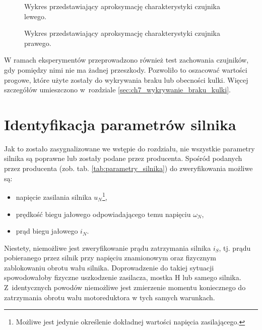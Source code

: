 \begin{figure}[h]
    \centering
    
    \caption{Wykres przedstawiający aproksymację charakterystyki czujnika lewego.}
    \label{fig:aproksymacja_czujnika_lewego}
\end{figure}

\begin{figure}[h]
    \centering
    
    \caption{Wykres przedstawiający aproksymację charakterystyki czujnika prawego.}
    \label{fig:aproksymacja_czujnika_prawego}
\end{figure}

W ramach eksperymentów przeprowadzono również test zachowania czujników, gdy pomiędzy nimi nie ma żadnej przeszkody. Pozwoliło to oszacować wartości progowe, które użyte zostały do wykrywania braku lub obecności kulki. Więcej szczegółów umieszczono w~rozdziale \ref{sec:ch7_wykrywanie_braku_kulki}.

\section{Identyfikacja parametrów silnika}
\label{sec:ch5_identyfikacja_parametrow_silnika}

Jak to zostało zasygnalizowane we wstępie do rozdziału, nie wszystkie parametry silnika są poprawne lub zostały podane przez producenta. Spośród podanych przez producenta (zob. tab. \ref{tab:parametry_silnika}) do zweryfikowania możliwe są:
\begin{itemize}
    \item napięcie zasilania silnika $u_N$\footnote{Możliwe jest jedynie określenie dokładnej wartości napięcia zasilającego.},
    \item prędkość biegu jałowego odpowiadającego temu napięciu $\omega_N$,
    \item prąd biegu jałowego $i_N$.
\end{itemize}

Niestety, niemożliwe jest zweryfikowanie prądu zatrzymania silnika $i_S$, tj. prądu pobieranego przez silnik przy napięciu znamionowym oraz fizycznym zablokowaniu obrotu wału silnika. Doprowadzenie do takiej sytuacji spowodowałoby fizyczne uszkodzenie zasilacza, mostka H lub samego silnika. Z~identycznych powodów niemożliwe jest zmierzenie momentu koniecznego do zatrzymania obrotu wału motoreduktora w tych samych warunkach.

